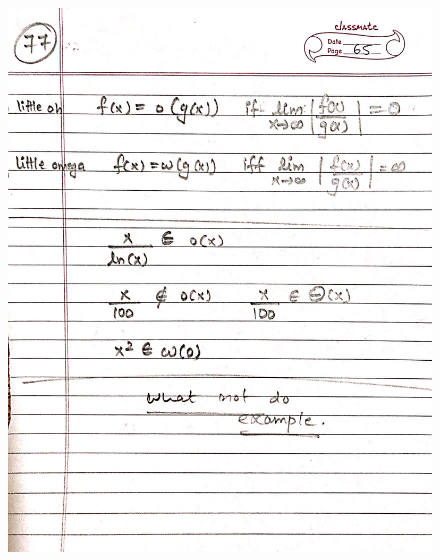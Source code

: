 \begin{figure}[H]
    \centering
    \includegraphics[width=16cm, height=21cm]{"./MIT-6.042J/MIT-6042J-077"}
\end{figure}

